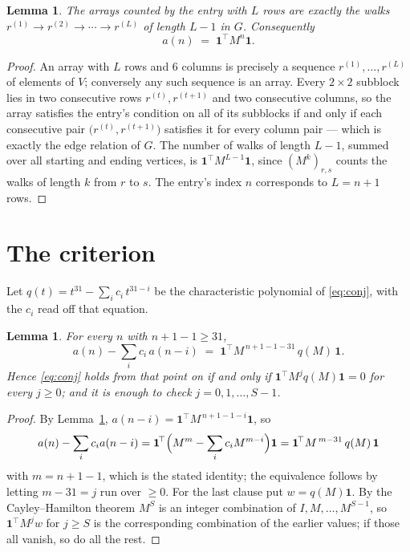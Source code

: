 \documentclass[11pt,a4paper]{article}
\theoremstyle{plain}
\newtheorem{lemma}[theorem]{Lemma}
\theoremstyle{definition}
\begin{document}
\begin{lemma}\label{lem:walk}
The arrays counted by the entry with $L$ rows are exactly the walks
$r^{(1)}\to r^{(2)}\to\cdots\to r^{(L)}$ of length $L-1$ in $G$. Consequently
\[
a(n)\;=\;\mathbf{1}^{\!\top}M^{n}\mathbf{1} .
\]
\end{lemma}

\begin{proof}
An array with $L$ rows and $6$ columns is precisely a sequence
$r^{(1)},\dots,r^{(L)}$ of elements of $V$; conversely any such sequence is an array.
Every $2\times2$ subblock lies in two consecutive rows $r^{(t)},r^{(t+1)}$ and two
consecutive columns, so the array satisfies the entry's condition on all of its subblocks
if and only if each consecutive pair $\bigl(r^{(t)},r^{(t+1)}\bigr)$ satisfies it for
every column pair --- which is exactly the edge relation of $G$. The number of walks of
length $L-1$, summed over all starting and ending vertices, is
$\mathbf{1}^{\!\top}M^{L-1}\mathbf{1}$, since $(M^{k})_{r,s}$ counts the walks of
length $k$ from $r$ to $s$. The entry's index $n$ corresponds to $L=n+1$ rows.
\end{proof}

\section{The criterion}

Let $q(t)=t^{31}-\sum_i c_i\,t^{31-i}$ be the characteristic polynomial of
\eqref{eq:conj}, with the $c_i$ read off that equation.

\begin{lemma}\label{lem:crit}
For every $n$ with $n+1-1\ge31$,
\[
a(n)-\sum_i c_i\,a(n-i)\;=\;\mathbf{1}^{\!\top}M^{\,n+1-1-31}\,q(M)\,\mathbf{1} .
\]
Hence \eqref{eq:conj} holds from that point on if and only if
$\mathbf{1}^{\!\top}M^{j}q(M)\mathbf{1}=0$ for every $j\ge0$; and it is enough to check
$j=0,1,\dots,S-1$.
\end{lemma}

\begin{proof}
By Lemma~\ref{lem:walk}, $a(n-i)=\mathbf{1}^{\!\top}M^{\,n+1-1-i}\mathbf{1}$, so
\[
a(n)-\sum_i c_i a(n-i)
=\mathbf{1}^{\!\top}\Bigl(M^{m}-\sum_i c_i M^{m-i}\Bigr)\mathbf{1}
=\mathbf{1}^{\!\top}M^{\,m-31}\,q(M)\,\mathbf{1}
\]
with $m=n+1-1$, which is the stated identity; the equivalence follows by letting
$m-31=j$ run over $\ge0$. For the last clause put $w=q(M)\mathbf{1}$. By the
Cayley--Hamilton theorem $M^{S}$ is an integer combination of $I,M,\dots,M^{S-1}$, so
$\mathbf{1}^{\!\top}M^{j}w$ for $j\ge S$ is the corresponding combination of the earlier
values; if those all vanish, so do all the rest.
\end{proof}
\end{document}
